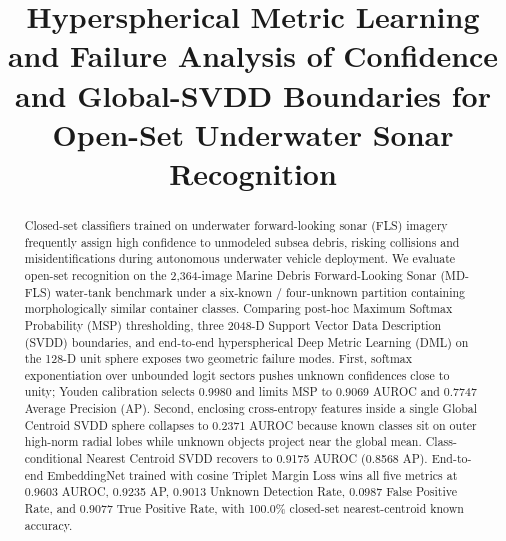 \documentclass[conference]{IEEEtran}
\begin{document}
\title{Hyperspherical Metric Learning and Failure Analysis of Confidence and Global-SVDD Boundaries for Open-Set Underwater Sonar Recognition}

\author{
\and
{}
\and
{}
}

\maketitle

\begin{abstract}
Closed-set classifiers trained on underwater forward-looking sonar (FLS) imagery frequently assign high confidence to unmodeled subsea debris, risking collisions and misidentifications during autonomous underwater vehicle deployment. We evaluate open-set recognition on the 2,364-image Marine Debris Forward-Looking Sonar (MD-FLS) water-tank benchmark under a six-known / four-unknown partition containing morphologically similar container classes. Comparing post-hoc Maximum Softmax Probability (MSP) thresholding, three 2048-D Support Vector Data Description (SVDD) boundaries, and end-to-end hyperspherical Deep Metric Learning (DML) on the 128-D unit sphere exposes two geometric failure modes. First, softmax exponentiation over unbounded logit sectors pushes unknown confidences close to unity; Youden calibration selects 0.9980 and limits MSP to 0.9069 AUROC and 0.7747 Average Precision (AP). Second, enclosing cross-entropy features inside a single Global Centroid SVDD sphere collapses to 0.2371 AUROC because known classes sit on outer high-norm radial lobes while unknown objects project near the global mean. Class-conditional Nearest Centroid SVDD recovers to 0.9175 AUROC (0.8568 AP). End-to-end EmbeddingNet trained with cosine Triplet Margin Loss wins all five metrics at 0.9603 AUROC, 0.9235 AP, 0.9013 Unknown Detection Rate, 0.0987 False Positive Rate, and 0.9077 True Positive Rate, with 100.0\% closed-set nearest-centroid known accuracy.
\end{abstract}
\end{document}
